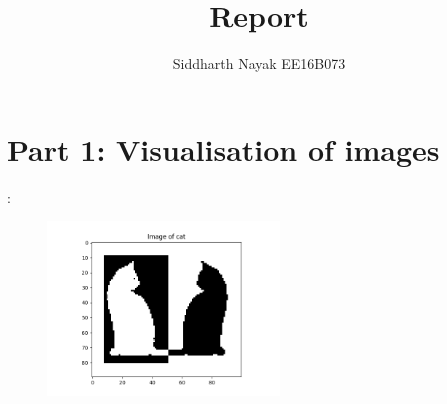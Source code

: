 \documentclass{article}
\title{Report}
\author{Siddharth Nayak EE16B073 }
\begin{document}
\maketitle
\newcommand{\norm}[1]{\left\lVert#1\right\rVert}

\section{Part 1: Visualisation of images}:

\begin{figure}[H]
\end{figure}

\begin{figure}[H]
\includegraphics[width=0.55\textwidth]{Figure_3.png}
\centering
\end{figure}
\end{document}
